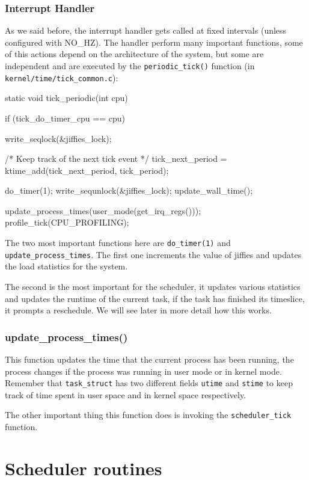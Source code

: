 \subsubsection{Interrupt Handler}

As we said before, the interrupt handler gets called at fixed intervals (unless configured with NO\_HZ). The handler perform many important functions, some of this actions depend on the architecture of the system, but some are independent and are executed by the \verb|periodic_tick()| function (in \verb|kernel/time/tick_common.c|):

\begin{code}
static void tick_periodic(int cpu)
{
	if (tick_do_timer_cpu == cpu) {
		write_seqlock(&jiffies_lock);

		/* Keep track of the next tick event */
		tick_next_period = ktime_add(tick_next_period, tick_period);

		do_timer(1);
		write_sequnlock(&jiffies_lock);
		update_wall_time();
	}

	update_process_times(user_mode(get_irq_regs()));
	profile_tick(CPU_PROFILING);
}
\end{code}
The two most important functions here are \verb|do_timer(1)| and \verb|update_process_times|. The first one increments the value of jiffies and updates the load statistics for the system.

The second is the most important for the scheduler, it updates various statistics and updates the runtime of the current task, if the task has finished its timeslice, it prompts a reschedule. We will see later in more detail how this works.

\subsubsection{update\_process\_times()}
This function updates the time that the current process has been running, the process changes if the process was running in user mode or in kernel mode. Remember that \verb|task_struct| has two different fields \verb|utime| and \verb|stime| to keep track of time spent in user space and in kernel space respectively.

The other important thing this function does is invoking the \verb|scheduler_tick| function.

\section{Scheduler routines}

